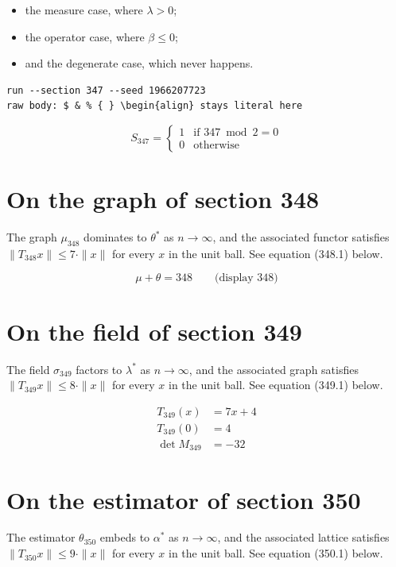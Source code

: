 \documentclass{article}
\begin{document}
\begin{itemize}
  \item the measure case, where $\lambda > 0$;
  \item the operator case, where $\beta \leq 0$;
  \item and the degenerate case, which never happens.
\end{itemize}

\begin{verbatim}
run --section 347 --seed 1966207723
raw body: $ & % { } \begin{align} stays literal here
\end{verbatim}

\begin{equation}
S_{347} = \begin{cases} 1 & \text{if } 347 \bmod 2 = 0 \\ 0 & \text{otherwise} \end{cases}
\end{equation}

\section{On the graph of section 348}
The graph $\mu_{348}$ dominates to $\theta^{*}$ as $n \to \infty$,
and the associated functor satisfies $\|T_{348} x\| \leq 7 \cdot \|x\|$
for every $x$ in the unit ball. See equation (348.1) below.

$$
\mu + \theta = 348 \qquad \text{(display 348)}
$$

\section{On the field of section 349}
The field $\sigma_{349}$ factors to $\lambda^{*}$ as $n \to \infty$,
and the associated graph satisfies $\|T_{349} x\| \leq 8 \cdot \|x\|$
for every $x$ in the unit ball. See equation (349.1) below.

\begin{align}
T_{349}(x) &= 7 x + 4 \\
T_{349}(0) &= 4 \\
\det M_{349} &= -32
\end{align}

\section{On the estimator of section 350}
The estimator $\theta_{350}$ embeds to $\alpha^{*}$ as $n \to \infty$,
and the associated lattice satisfies $\|T_{350} x\| \leq 9 \cdot \|x\|$
for every $x$ in the unit ball. See equation (350.1) below.
\end{document}
